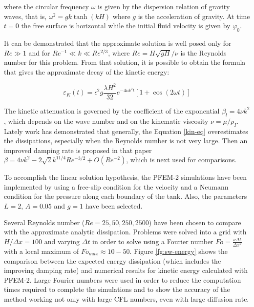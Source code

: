 where the circular frequency $\omega$ is given by the dispersion relation of gravity waves, that is, $\omega^2 = g k \tanh(kH)$ where $g$ is the acceleration of gravity. At time $t = 0$ the free surface is horizontal while the initial fluid velocity is given by $\varphi_0$.

It can be demonstrated that the approximate solution is well posed only for $Re\gg1$ and for $Re^{-1}\ll k \ll Re^{2/3}$, where $Re=H\sqrt{gH}/\nu$ is the Reynolds number for this problem. From that solution, it is possible to obtain the formula that gives the approximate decay of the kinetic energy\cite{Lighthill01}:

\begin{equation}
 \varepsilon_K(t) = \epsilon^2g\frac{\lambda H^2}{32}e^{-4\nu k^2t}\left[1+\cos(2\omega t)\right]
 \label{kin-eq}
\end{equation}

The kinetic attenuation is governed by the coefficient of the exponential $\beta_l = 4\nu k^2$, which depends on the wave number and on the kinematic viscosity $\nu = \mu/\rho_{I}$. Lately work\cite{Antuono13} has demonstrated that generally, the Equation \ref{kin-eq} overestimates the dissipations, especially when the Reynolds number is not very large. Then an improved damping rate is proposed in that paper $\beta = 4\nu k^2 -  2\sqrt{2}k^{11/4}Re^{-3/2}+O(Re^{-2})$, which is next used for comparisons.

To accomplish the linear solution hypothesis, the PFEM-2 simulations have been implemented by using a free-slip condition for the velocity and a Neumann condition for the pressure along each boundary of the tank. Also, the parameters $L=2$, $A=0.05$ and $g=1$ have been selected.

Several Reynolds number ($Re=25,50,250,2500$) have been chosen to compare with the approximate analytic dissipation. Problems were solved into a grid with $H/\Delta x=100$ and varying $\Delta t$ in order to solve using a Fourier number $Fo=\frac{\nu\Delta t}{\Delta x^2}$ with a local maximum of $Fo_{max}\approx10-50$. Figure \ref{fg:sw-energy} shows the comparison between the expected energy dissipation (which includes the improving damping rate) and numerical results for kinetic energy calculated with PFEM-2. Large Fourier numbers were used in order to reduce the computation times required to complete the simulations and to show the accuracy of the method working not only with large CFL numbers, even with large diffusion rate.

